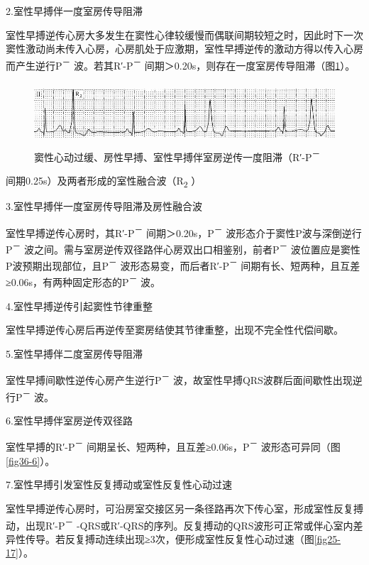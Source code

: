 2.室性早搏伴一度室房传导阻滞

室性早搏逆传心房大多发生在窦性心律较缓慢而偶联间期较短之时，因此时下一次窦性激动尚未传入心房，心房肌处于应激期，室性早搏逆传的激动方得以传入心房而产生逆行P\textsuperscript{－}
波。若其R′-P\textsuperscript{－}
间期＞0.20s，则存在一度室房传导阻滞（图\ref{fig11-28}）。

\begin{figure}[!htbp]
 \centering
 \includegraphics[width=5.58333in,height=0.90625in]{./images/Image00188.jpg}
 \captionsetup{justification=centering}
 \caption{窦性心动过缓、房性早搏、室性早搏伴室房逆传一度阻滞（R′-P\textsuperscript{－}}
 \label{fig11-28}
  \end{figure} 
间期0.25s）及两者形成的室性融合波（R\textsubscript{2} ）

3.室性早搏伴一度室房传导阻滞及房性融合波

室性早搏逆传心房时，其R′-P\textsuperscript{－}
间期＞0.20s，P\textsuperscript{－}
波形态介于窦性P波与深倒逆行P\textsuperscript{－}
波之间。需与室房逆传双径路伴心房双出口相鉴别，前者P\textsuperscript{－}
波位置应是窦性P波预期出现部位，且P\textsuperscript{－}
波形态易变，而后者R′-P\textsuperscript{－}
间期有长、短两种，且互差≥0.06s，有两种固定形态的P\textsuperscript{－}
波。

4.室性早搏逆传引起窦性节律重整

室性早搏逆传心房后再逆传至窦房结使其节律重整，出现不完全性代偿间歇。

5.室性早搏伴二度室房传导阻滞

室性早搏间歇性逆传心房产生逆行P\textsuperscript{－}
波，故室性早搏QRS波群后面间歇性出现逆行P\textsuperscript{－} 波。

6.室性早搏伴室房逆传双径路

室性早搏的R′-P\textsuperscript{－}
间期呈长、短两种，且互差≥0.06s，P\textsuperscript{－}
波形态可异同（图\ref{fig36-6}）。

7.室性早搏引发室性反复搏动或室性反复性心动过速

室性早搏逆传心房时，可沿房室交接区另一条径路再次下传心室，形成室性反复搏动，出现R′-P\textsuperscript{－}
-QRS或R′-QRS的序列。反复搏动的QRS波形可正常或伴心室内差异性传导。若反复搏动连续出现≥3次，便形成室性反复性心动过速（图\ref{fig25-17}）。

